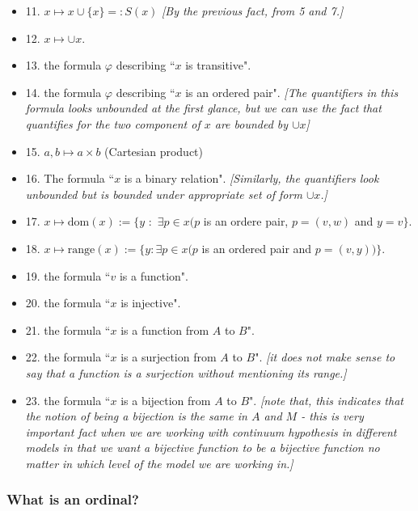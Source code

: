 \documentclass[12pt,a4paper]{article}
\renewenvironment{i}
{\begin{itemize} 
	}%
	{\end{itemize}
}
\begin{document}
\begin{i}
\item[11.] $x\mapsto x\cup \{x\} =: S(x)$ \emph{[By the previous fact, from 5 and 7.]}
\item[12.] $x\mapsto \cup x$.
\item[13.] the formula $\varphi$ describing ``$x$ is transitive".
\item[14.] the formula $\varphi$ describing ``$x$ is an ordered pair". \emph{[The quantifiers in this formula looks unbounded at the first glance, but we can use the fact that quantifies for the two component of $x$ are bounded by $\cup x$]}
\item[15.] $a,b \mapsto a\times b$ (Cartesian product)
\item[16.] The formula ``$x$ is a binary relation". \emph{[Similarly, the quantifiers look unbounded but is bounded under appropriate set of form $\cup x$.]}
\item[17.] $x\mapsto \text{dom}(x) := \{ y\,\, : \,\, \exists p \in x (p$ is an ordere pair, $p=(v,w)$ and $y=v\}$.
\item[18.] $x\mapsto \text{range}(x) := \{y : \exists p\in x(p$ is an ordered pair and $p=(v,y)) \}$.
\item[19.] the formula ``$v$ is a function".
\item[20.] the formula ``$x$ is injective".
\item[21.] the formula ``$x$ is a function from $A$ to $B$".
\item[22.] the formula ``$x$ is a surjection from $A$ to $B$". \emph{[it does not make sense to say that a function is a surjection without mentioning its range.]}
\item[23.] the formula ``$x$ is a bijection from $A$ to $B$". \emph{[note that, this indicates that the notion of being a bijection is the same in $A$ and $M$ - this is very important fact when we are working with continuum hypothesis in different models in that we want a bijective function to be a bijective function no matter in which level of the model we are working in.]}
\end{i}
\s

\subsubsection*{What is an ordinal?}
\end{document}
